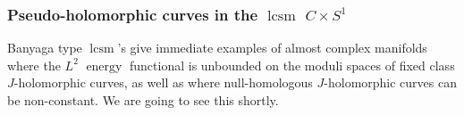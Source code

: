 \documentclass{amsart}
\numberwithin{equation}{section}
\newtheorem{theorem}[equation]{Theorem}
\newtheorem{definition}[equation]{Definition}
\theoremstyle{definition}
\theoremstyle{remark}
\DeclareMathOperator {\energy} {energy}
\DeclareMathOperator{\lcs}{lcs}
\DeclareMathOperator{\lcsm}{lcsm}
\begin{document}
%
%
\subsubsection{Pseudo-holomorphic curves in the $\lcsm$ $C \times S ^{1}$} 
\label{sec:gromov_witten_theory_of_the_lcs_c_times_s_1_}
Banyaga type $\lcsm$'s give immediate examples of almost complex manifolds 
where the $L ^{2} $ $\energy$ functional is unbounded on the moduli spaces of fixed class $J$-holomorphic curves, as well as where null-homologous $J$-holomorphic curves can be non-constant. We are going to see this shortly.
\end{document}
